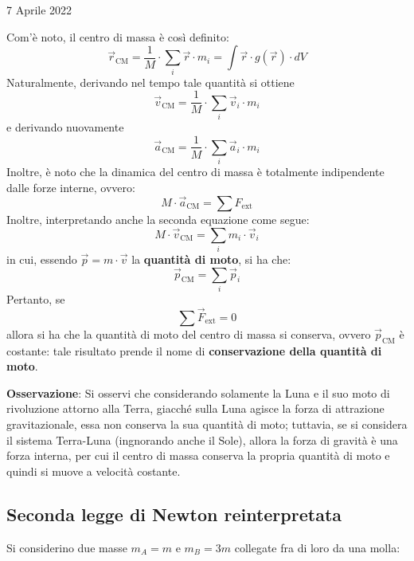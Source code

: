 \documentclass[a4paper]{extarticle}
\begin{document}
\newpage
\noindent
\begin{center}
  7 Aprile 2022
\end{center}
Com'è noto, il centro di massa è così definito:
\[\vec r_{\text{CM}} = \frac{1}{M} \cdot \sum_i \vec r \cdot m_i = \int \vec r \cdot g(\vec r) \cdot dV\]
Naturalmente, derivando nel tempo tale quantità si ottiene
\[\vec v_{\text{CM}} = \frac{1}{M} \cdot \sum_i \vec v_i \cdot m_i\]
e derivando nuovamente
\[\vec a_{\text{CM}} = \frac{1}{M} \cdot \sum_i \vec a_i \cdot m_i\]
Inoltre, è noto che la dinamica del centro di massa è totalmente indipendente dalle forze interne, ovvero:
\[M \cdot \vec a_{\text{CM}} = \sum F_{\text{ext}}\]
Inoltre, interpretando anche la seconda equazione come segue:
\[M \cdot \vec v_{\text{CM}} = \sum_i m_i \cdot \vec v_i\]
in cui, essendo $\vec p = m \cdot \vec v$ la \textbf{quantità di moto}, si ha che:
\[\boxed{\vec p_{\text{CM}} = \sum_i \vec p_i}\]
Pertanto, se
\[\sum \vec F_{\text{ext}} = 0\]
allora si ha che la quantità di moto del centro di massa si conserva, ovvero $\vec p_{\text{CM}}$ è costante: tale risultato prende il nome di \textbf{conservazione della quantità di moto}.

\vspace{1em}
\noindent
\textbf{Osservazione}: Si osservi che considerando solamente la Luna e il suo moto di rivoluzione attorno alla Terra, giacché sulla Luna agisce la forza di attrazione gravitazionale, essa non conserva la sua quantità di moto; tuttavia, se si considera il sistema Terra-Luna (ingnorando anche il Sole), allora la forza di gravità è una forza interna, per cui il centro di massa conserva la propria quantità di moto e quindi si muove a velocità costante.

\vspace{1em}
\subsection{Seconda legge di Newton reinterpretata}
Si considerino due masse $m_A=m$ e $m_B=3m$ collegate fra di loro da una molla:
\end{document}
